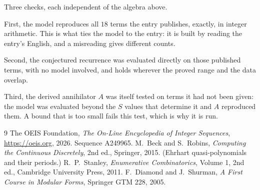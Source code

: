 \documentclass[11pt,a4paper]{article}
\theoremstyle{plain}
\theoremstyle{definition}
\begin{document}
Three checks, each independent of the algebra above.

First, the model reproduces all $18$ terms the entry publishes, exactly, in integer
arithmetic. This is what ties the model to the entry: it is built by reading the entry's
English, and a misreading gives different counts.

Second, the conjectured recurrence was evaluated directly on those published terms, with no
model involved, and holds wherever the proved range and the data overlap.

Third, the derived annihilator $A$ was itself tested on terms it had not been given: the model
was evaluated beyond the $S$ values that determine it and $A$ reproduced them. A bound that is
too small fails this test, which is why it is run.

\begin{thebibliography}{9}
 The OEIS Foundation, \emph{The On-Line Encyclopedia of Integer
Sequences}, \url{https://oeis.org}, 2026. Sequence A249965.
 M.~Beck and S.~Robins, \emph{Computing the Continuous Discretely},
2nd ed., Springer, 2015. (Ehrhart quasi-polynomials and their periods.)
 R.~P.~Stanley, \emph{Enumerative Combinatorics}, Volume 1, 2nd ed.,
Cambridge University Press, 2011.
 F.~Diamond and J.~Shurman, \emph{A First Course in Modular Forms},
Springer GTM 228, 2005.
\end{thebibliography}
\end{document}
